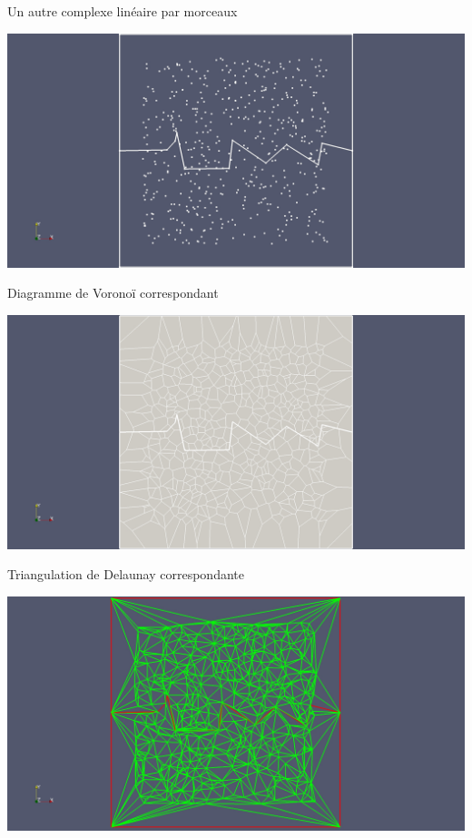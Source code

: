 \documentclass[aspectratio=169, 12pt, a4paper, hyperref={pdfauthor={Alexandre MARIN}, pdfkeywords={IFPEN, Delaunay, Voronoi, mesh generation}, colorlinks=true, linkcolor=purple, urlcolor=blue, citecolor=magenta}]{beamer}
\begin{document}
\begin{Energie}{\normalsize Un autre complexe linéaire par morceaux}
\begin{center}\vspace{-1cm}
\includegraphics[scale=0.18, viewport=500 0 1700 1300, clip]{plc.jpg}
\end{center}
\end{Energie}

\begin{Energie}{\normalsize Diagramme de Voronoï correspondant}
\begin{center}\vspace{-1cm}
\includegraphics[scale=0.18, viewport=500 0 1700 1300, clip]{extended_vor.jpg}
\end{center}
\end{Energie}

\begin{Energie}{\normalsize Triangulation de Delaunay correspondante}
\begin{center}\vspace{-1cm}
\includegraphics[scale=0.18, viewport=480 0 1630 1300, clip]{interfaceInSquare.jpg}
\end{center}
\end{Energie}
\end{document}
